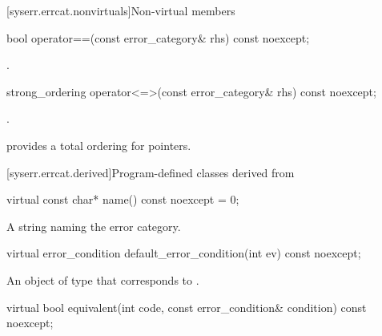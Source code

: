 [syserr.errcat.nonvirtuals]{Non-virtual members}

%
\begin{itemdecl}
bool operator==(const error_category& rhs) const noexcept;
\end{itemdecl}

\begin{itemdescr}
\pnum
\returns
{}.
\end{itemdescr}

%
\begin{itemdecl}
strong_ordering operator<=>(const error_category& rhs) const noexcept;
\end{itemdecl}

\begin{itemdescr}
\pnum
\returns
{}.

\begin{note}
 provides a total ordering for pointers.
\end{note}
\end{itemdescr}

[syserr.errcat.derived]{Program-defined classes derived from }

%
\begin{itemdecl}
virtual const char* name() const noexcept = 0;
\end{itemdecl}

\begin{itemdescr}
\pnum
\returns
A string naming the error category.
\end{itemdescr}

%
\begin{itemdecl}
virtual error_condition default_error_condition(int ev) const noexcept;
\end{itemdecl}

\begin{itemdescr}
\pnum
\returns
An object of type  that corresponds to .
\end{itemdescr}

%
\begin{itemdecl}
virtual bool equivalent(int code, const error_condition& condition) const noexcept;
\end{itemdecl}

